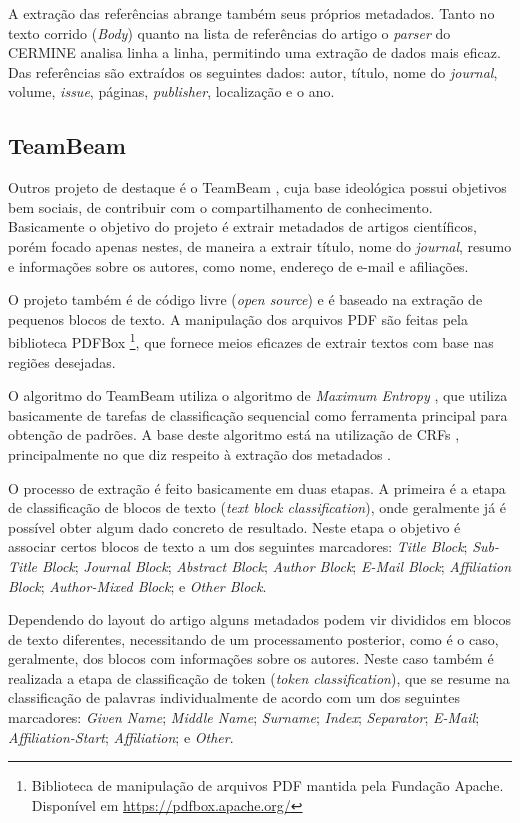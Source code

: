 A extração das referências abrange também seus próprios metadados. Tanto no texto corrido (\textit{Body}) quanto na lista de referências do artigo o \textit{parser} do CERMINE analisa linha a linha, permitindo uma extração de dados mais eficaz. Das referências são extraídos os seguintes dados: autor, título, nome do \textit{journal}, volume, \textit{issue}, páginas, \textit{publisher}, localização e o ano.

\subsection{TeamBeam}

Outros projeto de destaque é o TeamBeam \cite{teambeam}, cuja base ideológica possui objetivos bem sociais, de contribuir com o compartilhamento de conhecimento. Basicamente o objetivo do projeto é extrair metadados de artigos científicos, porém focado apenas nestes, de maneira a extrair título, nome do \textit{journal}, resumo e informações sobre os autores, como nome, endereço de e-mail e afiliações.

O projeto também é de código livre (\textit{open source}) e é baseado na extração de pequenos blocos de texto. A manipulação dos arquivos PDF são feitas pela biblioteca PDFBox \footnote{Biblioteca de manipulação de arquivos PDF mantida pela Fundação Apache. Disponível em \url{https://pdfbox.apache.org/}}, que fornece meios eficazes de extrair textos com base nas regiões desejadas.

O algoritmo do TeamBeam utiliza o algoritmo de \textit{Maximum Entropy} \cite{maximum-entropy}, que utiliza basicamente de tarefas de classificação sequencial como ferramenta principal para obtenção de padrões. A base deste algoritmo está na utilização de CRFs \cite{crf}, principalmente no que diz respeito à extração dos metadados \cite{crf-ie}.

O processo de extração é feito basicamente em duas etapas. A primeira é a etapa de classificação de blocos de texto (\textit{text block classification}), onde geralmente já é possível obter algum dado concreto de resultado. Neste etapa o objetivo é associar certos blocos de texto a um dos seguintes marcadores: \textit{Title Block}; \textit{Sub-Title Block}; \textit{Journal Block}; \textit{Abstract Block}; \textit{Author Block}; \textit{E-Mail Block}; \textit{Affiliation Block}; \textit{Author-Mixed Block}; e \textit{Other Block}.

Dependendo do layout do artigo alguns metadados podem vir divididos em blocos de texto diferentes, necessitando de um processamento posterior, como é o caso, geralmente, dos blocos com informações sobre os autores. Neste caso também é realizada a etapa de classificação de token (\textit{token classification}), que se resume na classificação de palavras individualmente de acordo com um dos seguintes marcadores: \textit{Given Name}; \textit{Middle Name}; \textit{Surname}; \textit{Index}; \textit{Separator}; \textit{E-Mail}; \textit{Affiliation-Start}; \textit{Affiliation}; e \textit{Other}.

